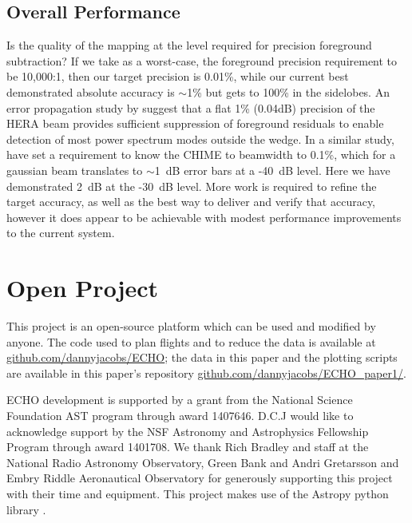 \documentclass[preprint2,numberedappendix,tighten,twocolappendix]{aastex6}
\begin{document}
\subsection{Overall Performance}

Is the quality of the mapping at the level required for precision foreground subtraction?   If we take as a worst-case, the foreground precision requirement to be 10,000:1, then our target precision is 0.01\%, while our current best demonstrated absolute accuracy is $\sim$1\% but gets to 100\% in the sidelobes.   %
An error propagation study by \citet{2016arXiv161002689E} suggest that a flat 1\% (0.04dB) precision of the HERA beam provides sufficient suppression of foreground residuals to enable detection of most power spectrum modes outside the wedge.  In a similar study, \citet{Shaw2015_chimemmodes} have set a requirement to know the CHIME to beamwidth to 0.1\%, which for a gaussian beam translates to $\sim$1~dB error bars at a -40~dB level. Here we have demonstrated 2~dB at the -30~dB level.  More work is required to refine the target accuracy, as well as the best way to deliver and verify that accuracy, however it does appear to be achievable with modest performance improvements to the current system.




\section*{Open Project}
This project is an open-source platform which can be used and modified by anyone. The code used to plan flights and to reduce the data is available at \url{github.com/dannyjacobs/ECHO}; the data in this paper and the plotting scripts are available in this paper's repository \url{github.com/dannyjacobs/ECHO_paper1/}.





\acknowledgments
ECHO development is supported by a grant from the National Science Foundation AST program through award 1407646. D.C.J would like to acknowledge support by the NSF Astronomy and Astrophysics Fellowship Program through award 1401708.  We thank Rich Bradley and staff at the National Radio Astronomy Observatory, Green Bank and Andri Gretarsson and Embry Riddle Aeronautical Observatory for generously supporting this project with their time and equipment. This project makes use of the Astropy python library \citep{2013Robitaille_Astropy}.



\end{document}
